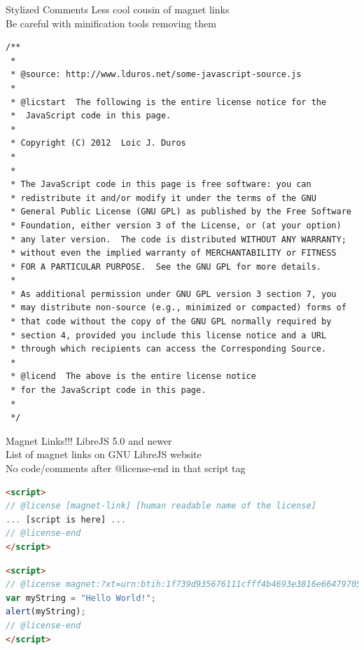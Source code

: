 \documentclass[11pt]{beamer}
\begin{document}
\begin{frame}[fragile]{Stylized Comments}
Less cool cousin of magnet links\\
Be careful with minification tools removing them\\
\begin{lstlisting}[language=HTML]
/**
 *
 * @source: http://www.lduros.net/some-javascript-source.js
 *
 * @licstart  The following is the entire license notice for the 
 *  JavaScript code in this page.
 *
 * Copyright (C) 2012  Loic J. Duros
 *
 *
 * The JavaScript code in this page is free software: you can
 * redistribute it and/or modify it under the terms of the GNU
 * General Public License (GNU GPL) as published by the Free Software
 * Foundation, either version 3 of the License, or (at your option)
 * any later version.  The code is distributed WITHOUT ANY WARRANTY;
 * without even the implied warranty of MERCHANTABILITY or FITNESS
 * FOR A PARTICULAR PURPOSE.  See the GNU GPL for more details.
 *
 * As additional permission under GNU GPL version 3 section 7, you
 * may distribute non-source (e.g., minimized or compacted) forms of
 * that code without the copy of the GNU GPL normally required by
 * section 4, provided you include this license notice and a URL
 * through which recipients can access the Corresponding Source.
 *
 * @licend  The above is the entire license notice
 * for the JavaScript code in this page.
 *
 */
\end{lstlisting}
\end{frame}

\begin{frame}[fragile]{Magnet Links!!!}
LibreJS 5.0 and newer\\
List of magnet links on GNU LibreJS website\\
No code/comments after @license-end in that script tag\\
\begin{lstlisting}[language=HTML]
<script>
// @license [magnet-link] [human readable name of the license]
... [script is here] ...
// @license-end
</script>
\end{lstlisting}
\begin{lstlisting}[language=HTML]
<script>
// @license magnet:?xt=urn:btih:1f739d935676111cfff4b4693e3816e664797050&dn=gpl-3.0.txt GPL-v3-or-Later
var myString = "Hello World!";
alert(myString);
// @license-end
</script>
\end{lstlisting}
\end{frame}
\end{document}
